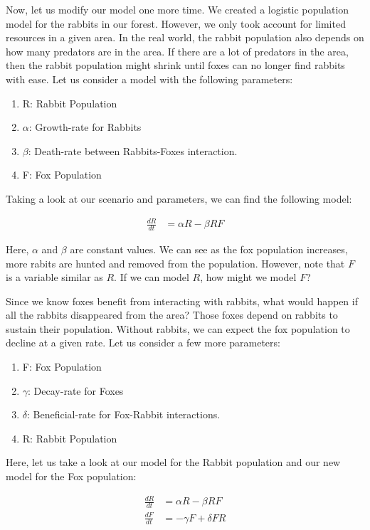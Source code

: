 \documentclass{amsart}
\theoremstyle{definition}
\numberwithin{equation}{section}
\begin{document}
\begin{sansmath}
Now, let us modify our model one more time. We created a logistic population model for the rabbits in our forest. However, we only took account for limited resources in a given area. In the real world, the rabbit population also depends on how many predators are in the area. If there are a lot of predators in the area, then the rabbit population might shrink until foxes can no longer find rabbits with ease. Let us consider a model with the following parameters:
\begin{enumerate}
  \item R: Rabbit Population
  \item $\alpha$: Growth-rate for Rabbits
  \item $\beta$: Death-rate between Rabbits-Foxes interaction.
  \item F: Fox Population
\end{enumerate}

Taking a look at our scenario and parameters, we can find the following model:

\begin{align*}
  \frac{dR}{dt} & = \alpha R - \beta RF
\end{align*}

Here, $\alpha$ and $\beta$ are constant values. We can see as the fox population increases, more rabits are hunted and removed from the population. However, note that $F$ is a variable similar as $R$. If we can model $R$, how might we model $F$?

Since we know foxes benefit from interacting with rabbits, what would happen if all the rabbits disappeared from the area? Those foxes depend on rabbits to sustain their population. Without rabbits, we can expect the fox population to decline at a given rate. Let us consider a few more parameters:
\newpage
\begin{enumerate}
  \item F: Fox Population
  \item $\gamma$: Decay-rate for Foxes
  \item $\delta$: Beneficial-rate for Fox-Rabbit interactions.
  \item R: Rabbit Population
\end{enumerate}

Here, let us take a look at our model for the Rabbit population and our new model for the Fox population:

\begin{align*}
  \frac{dR}{dt} & = \alpha R - \beta RF\\
  \frac{dF}{dt} & = -\gamma F + \delta FR
\end{align*}


\end{sansmath}
\end{document}
